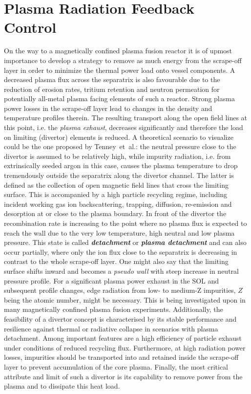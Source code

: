 %
\chapter{Plasma Radiation Feedback Control}\label{chap:realtimefeedback}%
%
    On the way to a magnetically confined plasma fusion reactor it is of upmost importance to develop a strategy to remove as much energy from the scrape-off layer in order to minimize the thermal power load onto vessel components\cite{Feng2016,Feng2005,Kallenbach2013,Pacher2007,Schmitz2020}. A decreased plasma flux across the separatrix is also favourable due to the reduction of erosion rates, tritium retention and neutron permeation for potentially all-metal plasma facing elements of such a reactor. Strong plasma power losses in the scrape-off layer lead to changes in the density and temperature profiles therein. The resulting transport along the open field lines at this point, i.e. the \textit{plasma exhaust}, decreases significantly and therefore the load on limiting (divertor) elements is reduced\cite{Kallenbach2013}. A theoretical scenario to visualize could be the one proposed by Tenney~et~al.\cite{Tenney1974}: the neutral pressure close to the divertor is assumed to be relatively high, while impurity radiation, i.e. from extrinsically seeded argon in this case, causes the plasma temperature to drop tremendously outside the separatrix along the divertor channel. The latter is defined as the collection of open magnetic field lines that cross the limiting surface. This is accompanied by a high particle recycling regime, including incident working gas ion backscattering, trapping, diffusion, re-emission and desorption at or close to the plasma boundary\cite{Marmar1978,Stangeby1990}. In front of the divertor the recombination rate is increasing to the point where no plasma flux is expected to reach the wall due to the very low temperature, high neutral and low plasma pressure. This state is called \textbf{\textit{detachment}} or \textbf{\textit{plasma detachment}} and can also occur partially, where only the ion flux close to the separatrix is decreasing in contrast to the whole scrape-off layer\cite{Loarte1998}. One might also say that the limiting surface shifts inward and becomes a \textit{pseudo wall} with steep increase in neutral pressure profile. For a significant plasma power exhaust in the SOL and subsequent profile changes, edge radiation from low- to medium-Z impurities, $Z$ being the atomic number, might be necessary. This is being investigated upon in many magnetically confined plasma fusion experiments\cite{Pacher2007,Kallenbach2013}. Additionally, the feasibility of a divertor concept is characterised by its stable performance and resilience against thermal or radiative collapse in scenarios with plasma detachment. Among important features are a high efficiency of particle exhaust under conditions of reduced recycling flux. Furthermore, at high radiation power losses, impurities should be transported into and retained inside the scrape-off layer to prevent accumulation of the core plasma. Finally, the most critical attribute and limit of such a divertor is its capability to remove power from the plasma and to dissipate this heat load.\\%
